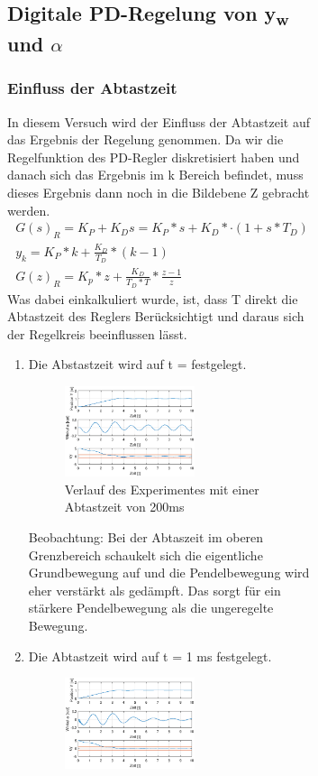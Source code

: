 \documentclass[10pt]{scrartcl}
\begin{document}
\begin{figure}[H]
\begin{figure}
\subsection{Digitale PD-Regelung von  y\textsubscript{w} und $\alpha$}
\subsubsection{Einfluss der Abtastzeit}
In diesem Versuch wird der Einfluss der Abtastzeit auf das Ergebnis der Regelung genommen. Da wir die Regelfunktion des PD-Regler diskretisiert haben und danach sich das Ergebnis im k Bereich befindet, muss dieses Ergebnis dann noch in die Bildebene Z gebracht werden. 
\begin{align}
   G(s)_R = K_P + K_D s = K_P *s + K_D *·(1 + s *T_D)  \\
   y_k= K_P * k+ \frac{K_D}{T_D} *( k - 1 )  \\
   G(z)_R = K_p * z + \frac{K_D}{T_D*T} *\frac{z-1}{z}
\end{align}
Was dabei einkalkuliert wurde, ist, dass T direkt die Abtastzeit des Reglers Berücksichtigt und daraus sich der Regelkreis beeinflussen lässt.
\begin{enumerate}
\item Die Abstastzeit wird auf t = festgelegt.
\begin{figure}[H]
	\centering
	\includegraphics[width=0.6\textwidth]{Figure45a200mT}
	\caption{Verlauf des Experimentes mit einer Abtastzeit von 200ms}
	\label{img:grafik-dummy}
\end{figure}
Beobachtung:
Bei der Abtaszeit im oberen Grenzbereich schaukelt sich die eigentliche Grundbewegung auf und die Pendelbewegung wird eher verstärkt als gedämpft. Das sorgt für ein stärkere Pendelbewegung als die ungeregelte Bewegung. 
\item Die Abtastzeit wird auf t = 1 ms festgelegt.
\begin{figure}[H]
	\centering
	\includegraphics[width=0.6\textwidth]{45a1mT}

\end{figure}
\end{enumerate}
\end{figure}
\end{figure}
\end{document}
